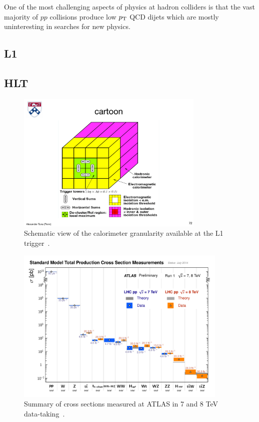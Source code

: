 One of the most challenging aspects of physics at hadron colliders is that the vast majority of $pp$ collisions produce low $p_{\mathrm{T}}$ QCD dijets which are mostly uninteresting in searches for new physics.

\subsection{L1}
\subsection{HLT}


\begin{figure}[tp]
  \centering
  \includegraphics[width=0.80\textwidth]{figures/trigger/cartoonL1}
  \caption{Schematic view of the calorimeter granularity available at the L1 trigger~\cite{1998.ATLAS-TDR-L1}.}
  \label{fig:prospects-trigger-cartoonL1}
\end{figure}

\begin{figure}[tp]
  \centering
  \includegraphics[width=0.90\textwidth]{figures/lhc-atlas/ATLAS_a_SMSummary_TotalXsect}
  \caption{Summary of cross sections measured at ATLAS in 7 and 8 TeV data-taking~\cite{2015.atlas-summary-SM}.}
  \label{fig:atlas-measurements}
\end{figure}


